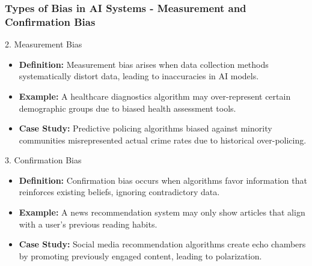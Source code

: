 \documentclass[aspectratio=169]{beamer}
\begin{document}
\begin{frame}[fragile]
    \frametitle{Types of Bias in AI Systems - Measurement and Confirmation Bias}
    \begin{block}{2. Measurement Bias}
        \begin{itemize}
            \item \textbf{Definition:} Measurement bias arises when data collection methods systematically distort data, leading to inaccuracies in AI models.
            \item \textbf{Example:} A healthcare diagnostics algorithm may over-represent certain demographic groups due to biased health assessment tools.
            \item \textbf{Case Study:} Predictive policing algorithms biased against minority communities misrepresented actual crime rates due to historical over-policing.
        \end{itemize}
    \end{block}

    \begin{block}{3. Confirmation Bias}
        \begin{itemize}
            \item \textbf{Definition:} Confirmation bias occurs when algorithms favor information that reinforces existing beliefs, ignoring contradictory data.
            \item \textbf{Example:} A news recommendation system may only show articles that align with a user's previous reading habits.
            \item \textbf{Case Study:} Social media recommendation algorithms create echo chambers by promoting previously engaged content, leading to polarization.
        \end{itemize}
    \end{block}
\end{frame}
\end{document}
